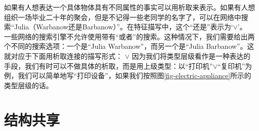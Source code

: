 如果有人想表达一个具体物体具有不同属性的事实可以用析取来表示。如果有人想组织一场毕业二十年的聚会，但是不记得一些老同学的名字了，可以在网络中搜索“Julia（Warbanow还是Barbanow）”。在特征描写中，这个“还是”表示为`$\vee$'\isc{$\vee$}\is{$\vee$}。
\ea
\ms[人]{
名  & julia\\
姓  & warbanow $\vee$ barbanow
}
\z
一些网络的搜索引擎不允许使用带有“或者”的搜索。这种情况下，我们需要给出两个不同的搜索选项：一个是“Julia Warbanow”，而另一个是“Julia Barbanow”。这就对应于下面用析取连接的描写形式：
\ea
\ms[人]{
名  & julia\\
姓  & warbanow
} $\vee $
\ms[人]{
名  & julia\\
姓  & barbanow
}
\z
因为我们将类型层级看作是一种表达的手段，我们有时可以不做具体的析取，而是用上级类型：以“打印机”$\vee$“复印机”为例，我们可以简单地写“打印设备”，如果我们按照图\vref{fig-electric-appliance}所示的类型层级的话。

\section{结构共享}
\label{sec-strukturteilung}

